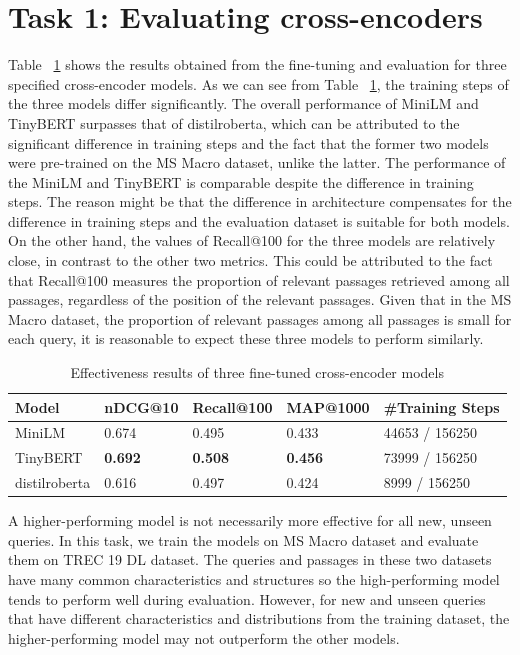 \documentclass[acmsmall]{acmart}
\begin{document}
\section{Task 1: Evaluating cross-encoders}
Table ~\ref{tab:results-task1} shows the results obtained from the fine-tuning and evaluation for three specified cross-encoder models. As we can see from Table ~\ref{tab:results-task1}, the training steps of the three models differ significantly. The overall performance of MiniLM and TinyBERT surpasses that of distilroberta, which can be attributed to the significant difference in training steps and the fact that the former two models were pre-trained on the MS Macro dataset, unlike the latter. The performance of the MiniLM and TinyBERT is comparable despite the difference in training steps. The reason might be that the difference in architecture compensates for the difference in training steps and the evaluation dataset is suitable for both models. On the other hand, the values of Recall@100 for the three models are relatively close, in contrast to the other two metrics. This could be attributed to the fact that Recall@100 measures the proportion of relevant passages retrieved among all passages, regardless of the position of the relevant passages. Given that in the MS Macro dataset, the proportion of relevant passages among all passages is small for each query, it is reasonable to expect these three models to perform similarly. 

\begin{table}[!ht]
    \centering
    \caption{Effectiveness results of three fine-tuned cross-encoder models}
    \label{tab:results-task1}
    \begin{tabular}{lllll}
        \toprule
        \textbf{Model} & \textbf{nDCG@10} & \textbf{Recall@100} & \textbf{MAP@1000} & \textbf{\#Training Steps}\\
        \midrule
        MiniLM & 0.674 & 0.495 & 0.433 & 44653 / 156250\\
        TinyBERT & \textbf{0.692} & \textbf{0.508} & \textbf{0.456} & 73999 / 156250\\
        distilroberta & 0.616 & 0.497 & 0.424 & 8999 / 156250\\
        \bottomrule
    \end{tabular}
\end{table}

A higher-performing model is not necessarily more effective for all new, unseen queries. In this task, we train the models on MS Macro dataset and evaluate them on TREC 19 DL dataset. The queries and passages in these two datasets have many common characteristics and structures so the high-performing model tends to perform well during evaluation. However, for new and unseen queries that have different characteristics and distributions from the training dataset, the higher-performing model may not outperform the other models.
\end{document}
